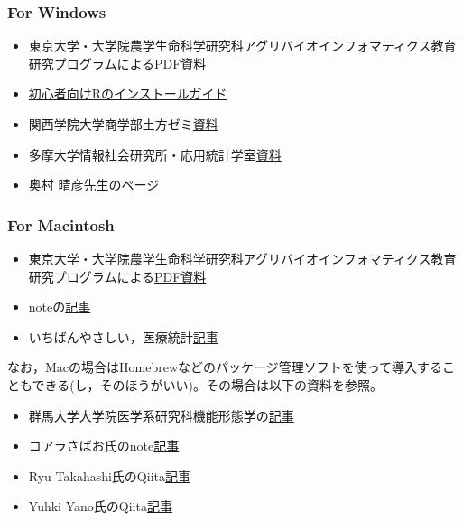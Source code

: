 \documentclass[
  a4paper,
]{ltjsbook}
\providecommand{\tightlist}{%
  \setlength{\itemsep}{0pt}\setlength{\parskip}{0pt}}\usepackage{longtable,booktabs,array}
\begin{document}
\hypertarget{for-windows}{%
\subsubsection{For Windows}\label{for-windows}}

\begin{itemize}
\tightlist
\item
  東京大学・大学院農学生命科学研究科アグリバイオインフォマティクス教育研究プログラムによる\href{https://www.iu.a.u-tokyo.ac.jp/textbook/R/R1.010_win.pdf}{PDF資料}
\item
  \href{https://syunsuke.github.io/r_install_guide_for_beginners/}{初心者向けRのインストールガイド}
\item
  関西学院大学商学部土方ゼミ\href{http://soc-research.org/ja/r_install_windows/}{資料}
\item
  多摩大学情報社会研究所・応用統計学室\href{多摩大学情報社会研究所・応用統計学室}{資料}
\item
  奥村
  晴彦先生の\href{https://okumuralab.org/~okumura/stat/R-win.html}{ページ}
\end{itemize}

\hypertarget{for-macintosh}{%
\subsubsection{For Macintosh}\label{for-macintosh}}

\begin{itemize}
\tightlist
\item
  東京大学・大学院農学生命科学研究科アグリバイオインフォマティクス教育研究プログラムによる\href{https://www.iu.a.u-tokyo.ac.jp/textbook/R/R1.010_mac.pdf}{PDF資料}
\item
  noteの\href{https://note.com/toshi_matsuura/n/n127cf28362e5}{記事}
\item
  いちばんやさしい，医療統計\href{https://best-biostatistics.com/r/rstudio_start.html\#i-3}{記事}
\end{itemize}

なお，Macの場合はHomebrewなどのパッケージ管理ソフトを使って導入することもできる(し，そのほうがいい)。その場合は以下の資料を参照。

\begin{itemize}
\tightlist
\item
  群馬大学大学院医学系研究科機能形態学の\href{https://anatomy.med.gunma-u.ac.jp/protocols/?p=979}{記事}
\item
  コアラさばお氏のnote\href{https://note.com/mackerelman/n/nfbf8054e90d5}{記事}
\item
  Ryu
  Takahashi氏のQiita\href{https://qiita.com/ryu-takahashi2718/items/1118cad7a4ef4900da96}{記事}
\item
  Yuhki
  Yano氏のQiita\href{https://qiita.com/y-vectorfield/items/dd1a8e2715cace9981ec}{記事}
\end{itemize}
\end{document}
